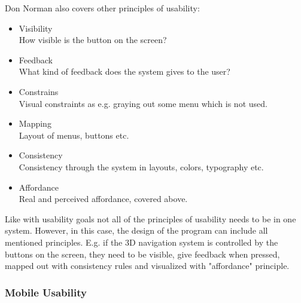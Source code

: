 Don Norman also covers other principles of usability:\cite{Normans}
\begin{itemize}
\item Visibility\\
How visible is the button on the screen?
\item Feedback\\
What kind of feedback does the system gives to the user?
\item Constrains\\
Visual constraints as e.g. graying out some menu which is not used.
\item Mapping \\
Layout of menus, buttons etc.
\item Consistency\\
Consistency through the system in layouts, colors, typography etc.
\item Affordance\\
Real and perceived affordance, covered above.
\end{itemize}

Like with usability goals not all of the principles of usability needs to be in 
one system. However, in this case, the design of the program can include all 
mentioned principles. E.g. if the 3D navigation system is controlled by the 
buttons on the screen, they need to be visible, give   feedback when 
pressed, mapped out with consistency rules and visualized with "affordance" 
principle. 

\subsubsection{Mobile Usability}
\label{MobileUsability}

